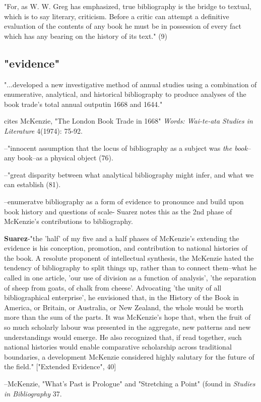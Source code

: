 \documentclass[course, english]{Notes}
\newcommand{\n}{\scalebox{2}{\textbf{\framebox{$\aleph$} } } }
\begin{document}
\1 "For, as W. W. Greg has emphasized, true bibliography is the bridge to textual, which is to say literary, criticism. Before a critic can attempt a definitive evaluation of the contents of any book he must be in possession of every fact which has any bearing on the history of its text." (9)



\subsection{"evidence"}

"...developed a new investigative method of annual studies using a combination of enumerative, analytical, and historical bibliography to produce analyses of the book trade's total annual outputin 1668 and 1644."

cites McKenzie, "The London Book Trade in 1668" \emph{Words: Wai-te-ata Studies in Literature} 4(1974): 75-92.
	\begin{displayquote}
	--"innocent assumption that the locus of bibliography as a subject was \emph{the book}--any book--as a physical object (76). 
	
	--"great disparity between what analytical bibliography might infer, and what we can establish (81). 
	\end{displayquote}

\n --enumeratve bibliography as a form of evidence to pronounce and build upon book history and questions of scale- Suarez notes this as the 2nd phase of McKenzie's contributions to bibliography.

\textbf{Suarez}-"the 'half' of my five and a half phases of McKenzie's extending the evidence is his conception, promotion, and contribution to national histories of the book. A resolute proponent of intellectual synthesis, the McKenzie hated the tendency of bibliography to split things up, rather than to connect them--what he called in one article, 'our use of division as a function of analysis', 'the separation of sheep from goats, of chalk from cheese'. Advocating 'the unity of all bibliographical  enterprise', he envisioned that, in the History of the Book in America, or Britain, or Australia, or New Zealand, the whole would be worth more than the sum of the parts. It was McKenzie's hope that, when the fruit of so much scholarly labour was presented in the aggregate, new patterns and new understandings would emerge. He also recognized that, if read together, such national histories would enable comparative scholarship across traditional boundaries, a development McKenzie considered highly salutary for the future of the field." ["Extended Evidence", 40]
	\begin{displayquote}
	--McKenzie, "What's Past is Prologue" and "Stretching a Point" (found in \emph{Studies in Bibliography} 37.
	\end{displayquote}
	
\end{document}
